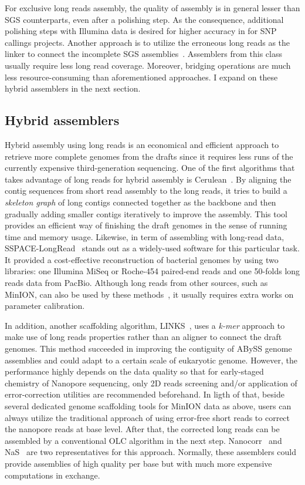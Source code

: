 For exclusive long reads assembly, the quality of assembly is in general lesser than SGS counterparts, even after a polishing step.  %
As the consequence, additional polishing steps with Illumina data is desired for higher accuracy in \EG{} for SNP callings projects.
Another approach is to utilize the erroneous long reads as the linker to connect the incomplete SGS assemblies~\cite{DeshpandeFP2013,BoetzerP2014}. Assemblers from this class usually require less long read coverage. Moreover, bridging operations are much less resource-consuming than aforementioned approaches.  I expand on these hybrid assemblers in the next section. 

\subsection{Hybrid assemblers}

Hybrid assembly using long reads is an economical and efficient approach to retrieve more complete genomes from the drafts since it requires less runs of the currently expensive third-generation sequencing. 
One of the first algorithms that takes advantage of long reads for hybrid assembly is Cerulean~\cite{DeshpandeFP2013}. By aligning the contig sequences from short read assembly to the long reads, it tries to build a \emph{skeleton graph} of long contigs connected together as the backbone and then gradually adding smaller contigs iteratively to improve the assembly. This tool provides an efficient way of finishing the draft genomes in the sense of running time and memory usage.
Likewise, in term of assembling with long-read data, SSPACE-LongRead~\cite{BoetzerP2014} stands out as a widely-used software for this particular task. %
It provided a cost-effective reconstruction of bacterial genomes by using two libraries: one Illumina MiSeq or Roche-454 paired-end reads and one 50-folds long reads data from PacBio.
Although long reads from other sources, such as MinION, can also be used by these methods~\cite{Karlsson2015}, it usually requires extra works on parameter calibration. 

In addition, another scaffolding algorithm, LINKS~\cite{WarrenYV2015}, uses a \emph{k-mer} approach to make use of long reads properties rather than an aligner to connect the draft genomes. This method  succeeded in improving the contiguity of ABySS genome
assemblies and could adapt to a certain scale of eukaryotic genome. However, the performance highly depends on the data quality so that for early-staged chemistry of Nanopore sequencing, only 2D reads screening and/or application of error-correction utilities are recommended beforehand.
In ligth of that, beside several dedicated genome scaffolding tools for MinION data as above, users can always utilize the traditional approach of using error-free short reads to correct the nanopore reads at base level. After that, the corrected long reads can be assembled by a conventional OLC algorithm in the next step. Nanocorr~\cite{GoodwinGE2015} and NaS~\cite{MadouiEC2015} are two representatives for this approach. Normally, these assemblers could provide assemblies of high quality per base but with much more expensive computations in exchange. 

